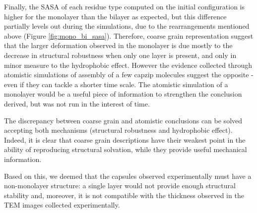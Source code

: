 Finally, the SASA of each residue type computed on the initial configuration is higher for the monolayer than the bilayer as expected, but this difference partially levels out during the simulations, due to the rearrangements mentioned above (Figure \ref{fig:mono_bi_sasa}). Therefore, coarse grain representation suggest that the larger deformation observed in the monolayer is due mostly to the decrease in structural robustness when only one layer is present, and only in minor measure to the hydrophobic effect.
%
However the evidence collected through atomistic simulations of assembly of a few capzip molecules suggest the opposite - even if they can tackle a shorter time scale.
The atomistic simulation of a monolayer would be a useful piece of information to strengthen the conclusion derived, but was not run in the interest of time.

The discrepancy between coarse grain and atomistic conclusions can be solved accepting both mechanisms (structural robustness and hydrophobic effect). Indeed, it is clear that coarse grain descriptions have their weakest point in the ability of reproducing structural solvation, while they provide useful mechanical information.
 
Based on this, we deemed that the capsules observed experimentally must have a non-monolayer structure: a single layer would not provide enough structural stability and, moreover, it is not compatible with the thickness observed in the TEM images collected experimentally.


